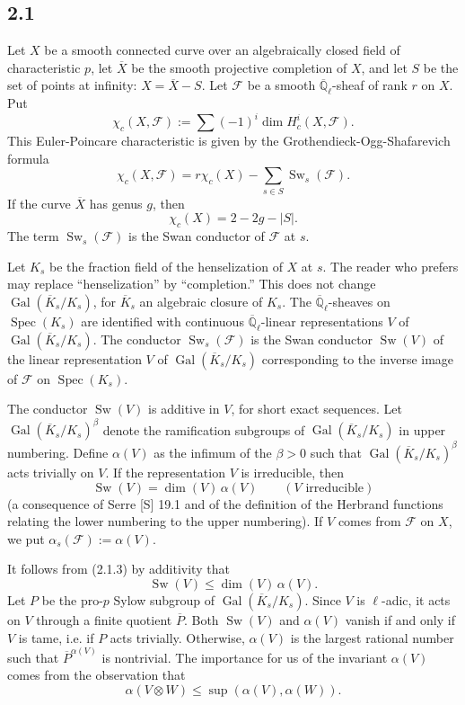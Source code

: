 \documentclass[11pt]{article}
\newcommand{\Ql}{\overline{\mathbb Q}_{\ell}}
\newcommand{\Spec}{\operatorname{Spec}}
\newcommand{\Gal}{\operatorname{Gal}}
\newcommand{\Sw}{\operatorname{Sw}}
\begin{document}
\subsection*{2.1}
Let $X$ be a smooth connected curve over an algebraically closed field of characteristic $p$, let $\overline X$ be the smooth projective completion of $X$, and let $S$ be the set of points at infinity: $X=\overline X-S$.
Let $\mathcal F$ be a smooth $\Ql$-sheaf of rank $r$ on $X$.
Put
\[
 \chi_c(X,\mathcal F):=\sum (-1)^i\dim H^i_c(X,\mathcal F).
\]
This Euler-Poincare characteristic is given by the Grothendieck-Ogg-Shafarevich formula
\begin{equation}
 \chi_c(X,\mathcal F)=r\chi_c(X)-\sum_{s\in S}\Sw_s(\mathcal F).
\tag{2.1.1}
\end{equation}
If the curve $\overline X$ has genus $g$, then
\begin{equation}
 \chi_c(X)=2-2g-|S|.
\tag{2.1.2}
\end{equation}
The term $\Sw_s(\mathcal F)$ is the Swan conductor of $\mathcal F$ at $s$.

Let $K_s$ be the fraction field of the henselization of $X$ at $s$.
The reader who prefers may replace ``henselization'' by ``completion.''
This does not change $\Gal(\overline K_s/K_s)$, for $\overline K_s$ an algebraic closure of $K_s$.
The $\Ql$-sheaves on $\Spec(K_s)$ are identified with continuous $\Ql$-linear representations $V$ of $\Gal(\overline K_s/K_s)$.
The conductor $\Sw_s(\mathcal F)$ is the Swan conductor $\Sw(V)$ of the linear representation $V$ of $\Gal(\overline K_s/K_s)$ corresponding to the inverse image of $\mathcal F$ on $\Spec(K_s)$.

The conductor $\Sw(V)$ is additive in $V$, for short exact sequences.
Let $\Gal(\overline K_s/K_s)^\beta$ denote the ramification subgroups of $\Gal(\overline K_s/K_s)$ in upper numbering.
Define $\alpha(V)$ as the infimum of the $\beta>0$ such that $\Gal(\overline K_s/K_s)^\beta$ acts trivially on $V$.
If the representation $V$ is irreducible, then
\begin{equation}
 \Sw(V)=\dim(V)\,\alpha(V)\qquad (V\text{ irreducible})
\tag{2.1.3}
\end{equation}
(a consequence of Serre [S] 19.1 and of the definition of the Herbrand functions relating the lower numbering to the upper numbering).
If $V$ comes from $\mathcal F$ on $X$, we put $\alpha_s(\mathcal F):=\alpha(V)$.

It follows from (2.1.3) by additivity that
\begin{equation}
 \Sw(V)\le \dim(V)\,\alpha(V).
\tag{2.1.4}
\end{equation}
Let $P$ be the pro-$p$ Sylow subgroup of $\Gal(\overline K_s/K_s)$.
Since $V$ is $\ell$-adic, it acts on $V$ through a finite quotient $\overline P$.
Both $\Sw(V)$ and $\alpha(V)$ vanish if and only if $V$ is tame, i.e. if $P$ acts trivially.
Otherwise, $\alpha(V)$ is the largest rational number such that $\overline P^{\alpha(V)}$ is nontrivial.
The importance for us of the invariant $\alpha(V)$ comes from the observation that
\begin{equation}
 \alpha(V\otimes W)\le \sup(\alpha(V),\alpha(W)).
\tag{2.1.5}
\end{equation}
\end{document}
